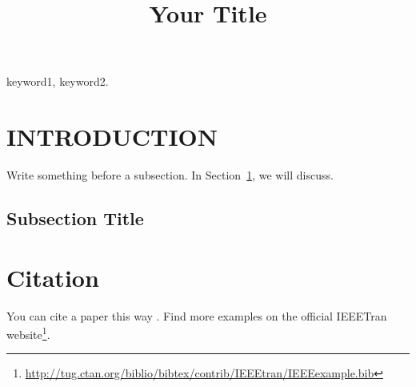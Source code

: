 \documentclass[conference, a4paper]{IEEEtran}
\begin{document}
\title{Your Title}

\author{

}

\maketitle


\begin{abstract}
\boldmath 
\lipsum[1]
\end{abstract}

\begin{IEEEkeywords}
keyword1, keyword2.
\end{IEEEkeywords}


\section{INTRODUCTION}
\label{sec:title}

Write something before a subsection. 
In Section~\ref{sec:title}, we will discuss. 

\subsection{Subsection Title}
\label{sec:sub:title}


\section{Citation}
\label{sec:citation}

You can cite a paper this way \cite{lecun2015deep}. 
Find more examples on the official IEEETran website\footnote{\url{http://tug.ctan.org/biblio/bibtex/contrib/IEEEtran/IEEEexample.bib}}.  
\end{document}
